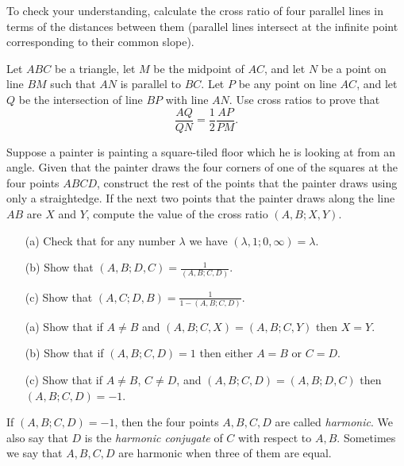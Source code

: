 To check your understanding, calculate the cross ratio of four parallel lines in terms of the distances between them (parallel lines intersect at the infinite point corresponding to their common slope).

\begin{exer} Let $ABC$ be a triangle, let $M$ be the midpoint of $AC$, and let $N$ be a point on line $BM$ such that $AN$ is parallel to $BC$. Let $P$ be any point on line $AC$, and let $Q$ be the intersection of line $BP$ with line $AN$. Use cross ratios to prove that
\[
\frac{AQ}{QN} = \frac{1}{2}\frac{AP}{PM}.
\]
\end{exer}

\begin{exer} Suppose a painter is painting a square-tiled floor which he is looking at from an angle. Given that the painter draws the four corners of one of the squares at the four points $ABCD$, construct the rest of the points that the painter draws using only a straightedge. If the next two points that the painter draws along the line $AB$ are $X$ and $Y$, compute the value of the cross ratio $(A,B;X,Y)$.
\end{exer}

\begin{exer}
\begin{itemize}
\item[(a)] Check that for any number $\lambda$ we have $(\lambda,1;0,\infty) = \lambda$.
\item[(b)] Show that $(A,B;D,C) = \frac{1}{(A,B;C,D)}$.
\item[(c)] Show that $(A,C;D,B) = \frac{1}{1-(A,B;C,D)}$.
\end{itemize}
\end{exer}

\begin{exer}
\begin{itemize}
\item[(a)] Show that if $A\ne B$ and $(A,B;C,X) = (A,B;C,Y)$ then $X=Y$.
\item[(b)] Show that if $(A,B;C,D) = 1$ then either $A=B$ or $C=D$.
\item[(c)] Show that if $A\ne B$, $C\ne D$, and $(A,B;C,D) = (A,B;D,C)$ then $(A,B;C,D) = -1$.
\end{itemize}
\end{exer}

\begin{defn} If $(A,B;C,D) = -1$, then the four points $A,B,C,D$ are called \emph{harmonic}. We also say that $D$ is the \emph{harmonic conjugate} of $C$ with respect to $A,B$. Sometimes we say that $A,B,C,D$ are harmonic when three of them are equal.
\end{defn}

